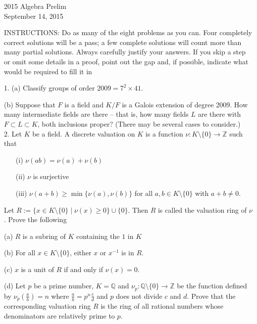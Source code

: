 \documentclass[11pt]{article}
\newcommand{\Z}{\mathbb{Z}}
\newcommand{\Q}{\mathbb{Q}}
\begin{document}
\begin{center}
\Large 2015 Algebra Prelim\\
\normalsize September 14, 2015
\end{center}
\vspace{1em}

INSTRUCTIONS: Do as many of the eight problems as you can. Four completely
correct solutions will be a pass; a few complete solutions will count more than many
partial solutions. Always carefully justify your answers. If you skip a step or omit
some details in a proof, point out the gap and, if possible, indicate what would be
required to fill it in\\
\vspace{1em}

1. (a) Classify groups of order $2009 = 7^2\times 41$. 

(b) Suppose that $F$ is a field and $K/F$ is a Galois extension of degree 2009. How many intermediate fields are there -- that is, how many fields $L$ are there with $F\subset L \subset K$, both inclusions proper? (There may be several cases to consider.)\\

2. Let $K$ be a field. A discrete valuation on $K$ is a function $\nu:K\setminus\{0\}\to \Z$ such that \begin{itemize}
\item[(i)] $\nu(ab) = \nu(a)+\nu(b)$
\item[(ii)] $\nu$ is surjective 
\item[(iii)] $\nu(a+b) \ge \min \{\nu(a),\nu(b)\}$ for all $a,b\in K\setminus\{0\}$ with $a+b\neq 0$.
\end{itemize}
Let $R:=\{x\in K\setminus\{0\}\mid \nu(x)\ge 0\} \cup \{0\}$. Then $R$ is called the valuation ring of $\nu$. Prove the following 

(a) $R$ is a subring of $K$ containing the $1$ in $K$

(b) For all $x\in K\setminus\{0\}$, either $x$ or $x^{-1}$ is in $R$. 

(c) $x$ is a unit of $R$ if and only if $\nu(x) = 0$. 

(d) Let $p$ be a prime number, $K=\Q$ and $\nu_p:\Q\setminus\{0\}\to \Z$ be the function defined by $\nu_p(\frac{a}{b}) = n$ where $\frac{a}{b} = p^n\frac{c}{d}$ and $p$ does not divide $c$ and $d$. Prove that the corresponding valuation ring $R$ is the ring of all rational numbers whose denominators are relatively prime to $p$. \\
\end{document}
